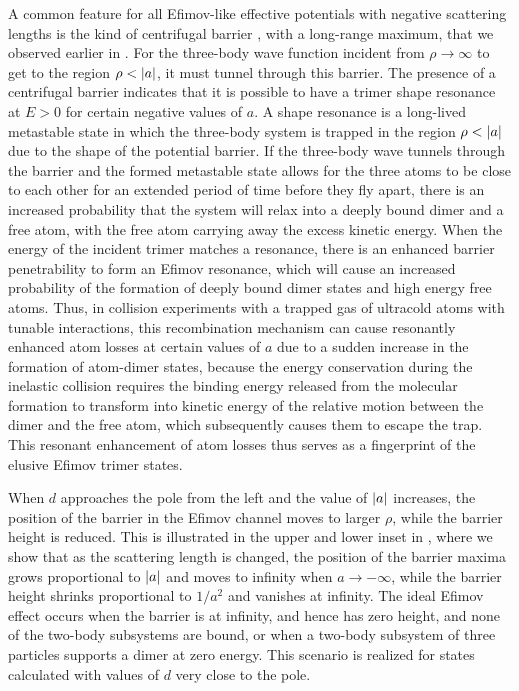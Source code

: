 A common feature for all Efimov-like effective potentials with negative scattering lengths is the kind of centrifugal barrier \cite{EsryGreenBurke1999}, with a long-range maximum, that we observed earlier in . For the three-body wave function incident from $\rho \rightarrow \infty$ to get to the region $\rho<\lvert a\rvert$, it must tunnel through this barrier. The presence of a centrifugal barrier indicates that it is possible to have a trimer shape resonance at $E>0$ for certain negative values of $a$. A shape resonance is a long-lived metastable state in which the three-body system is trapped in the region $\rho<\lvert a\rvert$ due to the shape of the potential barrier. If the three-body wave tunnels through the barrier and the formed metastable state allows for the three atoms to be close to each other for an extended period of time before they fly apart, there is an increased probability that the system will relax into a deeply bound dimer and a free atom, with the free atom carrying away the excess kinetic energy. When the energy of the incident trimer matches a resonance, there is an enhanced barrier penetrability to form an Efimov resonance, which will cause an increased probability of the formation of deeply bound dimer states and high energy free atoms. Thus, in collision experiments with a trapped gas of ultracold atoms with tunable interactions, this recombination mechanism can cause resonantly enhanced atom losses at certain values of $a$ due to a sudden increase in the formation of atom-dimer states, because the energy conservation during the inelastic collision requires the binding energy released from the molecular formation to transform into kinetic energy of the relative motion between the dimer and the free atom, which subsequently causes them to escape the trap. This resonant enhancement of atom losses thus serves as a fingerprint of the elusive Efimov trimer states. 

When $d$ approaches the pole from the left and the value of $\lvert a\rvert$ increases, the position of the barrier in the Efimov channel moves to larger $\rho$, while the barrier height is reduced. This is illustrated in the upper and lower inset in , where we show that as the scattering length is changed, the position of the barrier maxima grows proportional to $\lvert a\rvert$ and moves to infinity when $a \rightarrow -\infty$, while the barrier height shrinks proportional to $1/a^2$ and vanishes at infinity. The ideal Efimov effect occurs when the barrier is at infinity, and hence has zero height, and none of the two-body subsystems are bound, or when a two-body subsystem of three particles supports a dimer at zero energy. This scenario is realized for states calculated with values of $d$ very close to the pole. 

